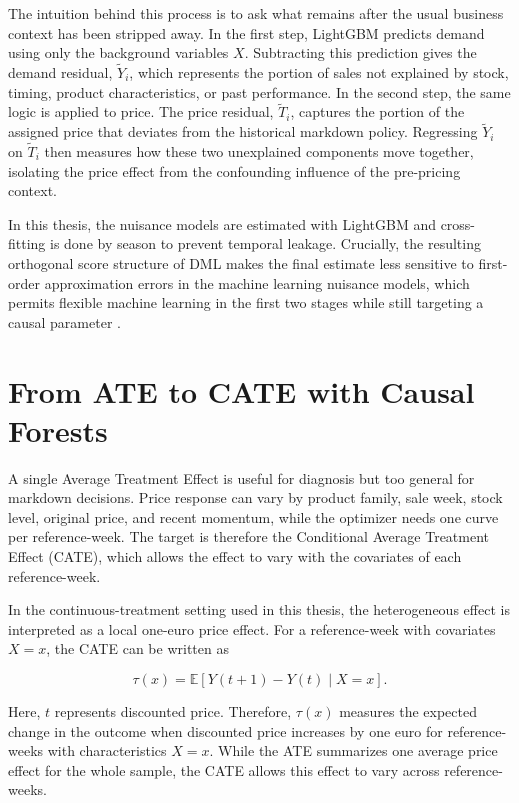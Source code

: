 The intuition behind this process is to ask what remains after the usual business context has been stripped away. In the first step, LightGBM predicts demand using only the background variables $X$. Subtracting this prediction gives the demand residual, $\tilde{Y}_i$, which represents the portion of sales not explained by stock, timing, product characteristics, or past performance. In the second step, the same logic is applied to price. The price residual, $\tilde{T}_i$, captures the portion of the assigned price that deviates from the historical markdown policy. Regressing $\tilde{Y}_i$ on $\tilde{T}_i$ then measures how these two unexplained components move together, isolating the price effect from the confounding influence of the pre-pricing context.

In this thesis, the nuisance models are estimated with LightGBM and cross-fitting is done by season to prevent temporal leakage. Crucially, the resulting orthogonal score structure of DML makes the final estimate less sensitive to first-order approximation errors in the machine learning nuisance models, which permits flexible machine learning in the first two stages while still targeting a causal parameter \cite{chernozhukov2018dml}.

\section{From ATE to CATE with Causal Forests}
\label{sec:cate-causal-forests}

A single Average Treatment Effect is useful for diagnosis but too general for markdown decisions. Price response can vary by product family, sale week, stock level, original price, and recent momentum, while the optimizer needs one curve per reference-week. The target is therefore the Conditional Average Treatment Effect (CATE), which allows the effect to vary with the covariates of each reference-week.

In the continuous-treatment setting used in this thesis, the heterogeneous effect is interpreted as a local one-euro price effect. For a reference-week with covariates $X=x$, the CATE can be written as

\begin{equation}
\tau(x)=\mathbb{E}[Y(t+1)-Y(t)\mid X=x].
\end{equation}

Here, $t$ represents discounted price. Therefore, $\tau(x)$ measures the expected change in the outcome when discounted price increases by one euro for reference-weeks with characteristics $X=x$. While the ATE summarizes one average price effect for the whole sample, the CATE allows this effect to vary across reference-weeks.

